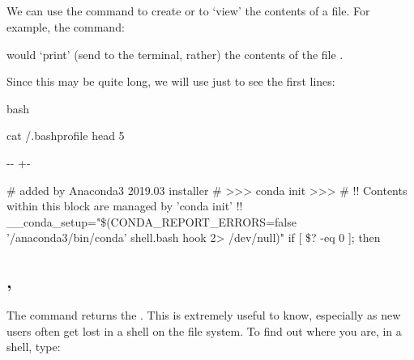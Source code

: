 \documentclass[letterpaper,10pt,english]{sphinxmanual}
\newlength\nbsphinxcodecellspacing
\begin{document}
\subsection{}
\label{\detokenize{Appendix1:cat}}
We can use the command  to create or to ‘view’ the contents of a file. For example, the command:

\begin{sphinxVerbatim}[commandchars=\\\{\}]
 
\end{sphinxVerbatim}

would ‘print’ (send to the terminal, rather) the contents of the file .

Since this may be quite long, we will use  just to see the first  lines:

{
\begin{sphinxVerbatim}[commandchars=\\\{\}]
\llap{\color{nbsphinxin}[11]:\,\hspace{\fboxrule}\hspace{\fboxsep}}\PYGZpc{}\PYGZpc{}bash

cat \PYGZti{}/.bash\PYGZus{}profile  head \PYGZhy{}5
\end{sphinxVerbatim}
}

{

\kern-\sphinxverbatimsmallskipamount\kern-\baselineskip
\kern+\FrameHeightAdjust\kern-\fboxrule
\vspace{\nbsphinxcodecellspacing}

\begin{sphinxVerbatim}[commandchars=\\\{\}]
\# added by Anaconda3 2019.03 installer
\# >>> conda init >>>
\# !! Contents within this block are managed by 'conda init' !!
\_\_conda\_setup="\$(CONDA\_REPORT\_ERRORS=false '/anaconda3/bin/conda' shell.bash hook 2> /dev/null)"
if [ \$? -eq 0 ]; then
\end{sphinxVerbatim}
}


\subsection{, }
\label{\detokenize{Appendix1:pwd,-cd}}
The command  returns the . This is extremely useful to know, especially as new users often get lost in a shell on the file system. To find out where you are, in a shell, type:
\end{document}

